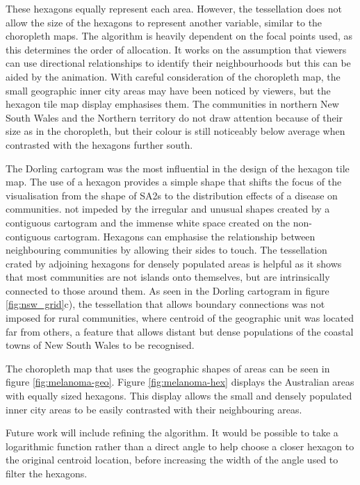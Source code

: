 These hexagons equally represent each area. However, the tessellation
does not allow the size of the hexagons to represent another variable,
similar to the choropleth maps. The algorithm is heavily dependent on
the focal points used, as this determines the order of allocation. It
works on the assumption that viewers can use directional relationships
to identify their neighbourhoods but this can be aided by the animation.
With careful consideration of the choropleth map, the small geographic
inner city areas may have been noticed by viewers, but the hexagon tile
map display emphasises them. The communities in northern New South Wales
and the Northern territory do not draw attention because of their size
as in the choropleth, but their colour is still noticeably below average
when contrasted with the hexagons further south.

The Dorling cartogram was the most influential in the design of the
hexagon tile map. The use of a hexagon provides a simple shape that
shifts the focus of the visualisation from the shape of SA2s to the
distribution effects of a disease on communities. not impeded by the
irregular and unusual shapes created by a contiguous cartogram and the
immense white space created on the non-contiguous cartogram. Hexagons
can emphasise the relationship between neighbouring communities by
allowing their sides to touch. The tessellation crated by adjoining
hexagons for densely populated areas is helpful as it shows that most
communities are not islands onto themselves, but are intrinsically
connected to those around them. As seen in the Dorling cartogram in
figure \ref{fig:nsw_grid}c), the tessellation that allows boundary
connections was not imposed for rural communities, where centroid of the
geographic unit was located far from others, a feature that allows
distant but dense populations of the coastal towns of New South Wales to
be recognised.

The choropleth map that uses the geographic shapes of areas can be seen
in figure \ref{fig:melanoma-geo}. Figure \ref{fig:melanoma-hex} displays
the Australian areas with equally sized hexagons. This display allows
the small and densely populated inner city areas to be easily contrasted
with their neighbouring areas.

Future work will include refining the algorithm. It would be possible to
take a logarithmic function rather than a direct angle to help choose a
closer hexagon to the original centroid location, before increasing the
width of the angle used to filter the hexagons.

